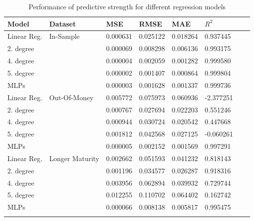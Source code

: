 \begin{table}[H]
\caption{Performance of predictive strength for different regression models}
\label{tab:euroPerformanceComparision}
\centering
\begin{tabular}{l l l l l l l l }
\toprule
\textbf{Model} & \textbf{Dataset} & \textbf{MSE} & \textbf{RMSE} & \textbf{MAE} & \textbf{$R^2$} \\
\midrule
Linear Reg. & In-Sample & 0.000631 & 0.025122 & 0.018264 & 0.937445\\
2. degree &  & 0.000069 & 0.008298 & 0.006136 & 0.993175\\
4. degree &  & 0.000004 & 0.002059 & 0.001282 & 0.999580\\
5. degree &  & 0.000002 & 0.001407 & 0.000864 & 0.999804\\
MLPs &  & 0.000003 & 0.001628 & 0.001337 & 0.999736\\
Linear Reg. & Out-Of-Money & 0.005772 & 0.075973 & 0.060936 & -2.377251\\
2. degree &  & 0.000767 & 0.027694 & 0.022203 & 0.551246\\
4. degree &  & 0.000944 & 0.030724 & 0.020542 & 0.447668\\
5. degree &  & 0.001812 & 0.042568 & 0.027125 & -0.060261\\
MLPs &  & 0.000005 & 0.002152 & 0.001569 & 0.997291\\
Linear Reg. & Longer Maturity & 0.002662 & 0.051593 & 0.041232 & 0.818143\\
2. degree &  & 0.001196 & 0.034577 & 0.026287 & 0.918316\\
4. degree &  & 0.003956 & 0.062894 & 0.039932 & 0.729744\\
5. degree &  & 0.012255 & 0.110702 & 0.064402 & 0.162742\\
MLPs &  & 0.000066 & 0.008138 & 0.005817 & 0.995475\\
\bottomrule\\
\end{tabular}
\end{table}


